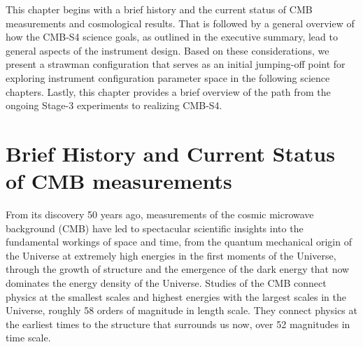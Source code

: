 
%

This chapter begins with a brief history and the current status of CMB measurements and cosmological results.  That is followed by a general overview of how the CMB-S4 science goals, as outlined in the executive summary, lead to general aspects of the instrument design. Based on these considerations, we present a strawman configuration that serves as an initial jumping-off point for exploring instrument configuration parameter space in the following science chapters.  Lastly, this chapter provides a brief overview of the path from the ongoing Stage-3 experiments to realizing CMB-S4. 

\section{Brief History and Current Status of CMB measurements}
\label{sec:background}

From its discovery 50 years ago, measurements of the cosmic microwave background (CMB) have led to spectacular scientific insights into the fundamental workings of space and time, from the quantum mechanical origin of the Universe at extremely high energies in the first moments of the Universe, through the growth of structure and the emergence of the dark energy that now dominates the energy density of the Universe. Studies of the CMB connect physics at the smallest scales and highest energies with the largest scales in the Universe, roughly 58 orders of magnitude in length scale. They connect physics at the earliest times to the structure that surrounds us now, over 52 magnitudes in time scale. 

